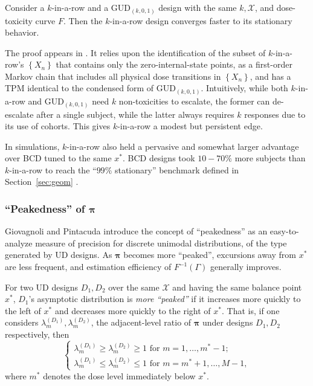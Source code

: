 \begin{thm}\label{thm:krgudconv} Consider a $k$-in-a-row and a GUD$_{(k,0,1)}$ design with the same $k,\mathcal{X}$, and dose-toxicity curve $F$. Then the $k$-in-a-row design converges faster to its stationary behavior.\end{thm}

\noindent The  proof appears in \cite{Oron:Hoff:thek:2009}. It relies upon the identification of the subset of $k$-in-a-row's $\left\{X_n\right\}$ that contains only the zero-internal-state points, as a first-order Markov chain that includes all physical dose transitions in $\left\{X_n\right\}$, and has a TPM identical to the condensed form of GUD$_{(k,0,1)}$. Intuitively, while both $k$-in-a-row and GUD$_{(k,0,1)}$ need $k$ non-toxicities to escalate, the former can de-escalate after a single subject, while the latter always requires $k$ responses due to its use of cohorts. This gives  $k$-in-a-row a modest but persistent edge.

In simulations, $k$-in-a-row also held a pervasive and somewhat larger advantage over BCD tuned to the same $x^*$. BCD designs took $10-70\%$ more subjects than $k$-in-a-row to reach the ``$99\%$ stationary'' benchmark defined in Section~\ref{sec:geom} \citep{Oron:Hoff:thek:2009}.

\subsubsection{``Peakedness'' of $\boldsymbol{\pi}$}

Giovagnoli and Pintacuda \citep{Giov:Pint:Pint:prop:1998} introduce the concept of ``peakedness'' as an easy-to-analyze measure of precision for discrete unimodal distributions, of the type generated by UD designs. As $\boldsymbol{\pi}$ becomes more ``peaked'', excursions away from $x^*$ are less frequent, and estimation efficiency of $F^{-1}\left(\Gamma\right)$ generally improves.

\begin{defn}\label{def:peak}
For two UD designs $D_1,D_2$ over the same $\mathcal{X}$ and having the same balance point $x^*$, $D_1$'s asymptotic distribution is \emph{more ``peaked''} if it increases more quickly to the left of $x^*$ and decreases more quickly to the right of $x^*$. That is, if one considers $\lambda^{(D_1)}_m,\lambda^{(D_2)}_m$, the adjacent-level ratio of $\boldsymbol{\pi}$ under designs $D_1,D_2$ respectively, then
\begin{equation}\label{eq:peakdef}
\begin{cases}
\lambda^{(D_1)}_{m}\ge\lambda^{(D_2)}_{m}\ge 1\textrm{ for }m=1,\ldots,m^*-1; \\
\lambda^{(D_1)}_{m}\le\lambda^{(D_2)}_{m} \le 1\textrm{ for }m = m^*+1,\ldots,M-1,
\end{cases}
\end{equation}
where $m^*$ denotes the dose level immediately below $x^*$.
\end{defn}

